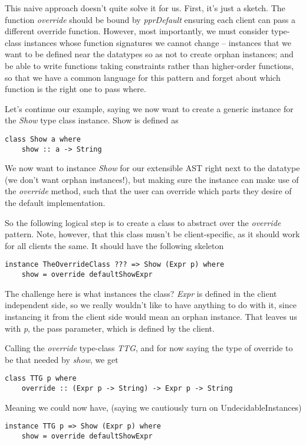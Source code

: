 \documentclass{article}
\begin{document}
This naive approach doesn't quite solve it for us. First, it's just a sketch.
The function \emph{override} should be bound by \emph{pprDefault} ensuring each
client can pass a different override function. However, most importantly, we
must consider type-class instances whose function signatures we cannot change --
instances that we want to be defined near the datatypes so as not to create
orphan instances; and be able to write functions taking constraints rather than
higher-order functions, so that we have a common language for this pattern and
forget about which function is the right one to pass where.

Let's continue our example, saying we now want to create a generic instance for
the \emph{Show} type class instance. Show is defined as
\begin{lstlisting}
class Show a where
    show :: a -> String
\end{lstlisting}

We now want to instance \emph{Show} for our extensible AST right next to the
datatype (we don't want orphan instances!), but making sure the instance can
make use of the \emph{override} method, such that the user can override which
parts they desire of the default implementation.

So the following logical step is to create a class to abstract over the
\emph{override} pattern. Note, however, that this class musn't be
client-specific, as it should work for all clients the same. It should have the
following skeleton

\begin{lstlisting}
instance TheOverrideClass ??? => Show (Expr p) where
    show = override defaultShowExpr
\end{lstlisting}

The challenge here is what instances the class? \emph{Expr} is defined in the
client independent side, so we really wouldn't like to have anything to do with
it, since instancing it from the client side would mean an orphan instance. That
leaves us with \emph{p}, the pass parameter, which is defined by the client.

Calling the \emph{override} type-class \emph{TTG}, and for now saying the type
of override to be that needed by \emph{show}, we get

\begin{lstlisting}
class TTG p where
    override :: (Expr p -> String) -> Expr p -> String
\end{lstlisting}

Meaning we could now have, (saying we cautiously turn on UndecidableInstances)
\begin{lstlisting}
instance TTG p => Show (Expr p) where
    show = override defaultShowExpr
\end{lstlisting}
\end{document}
